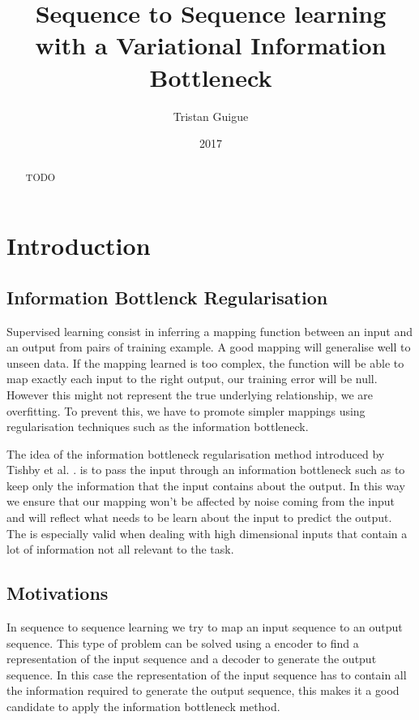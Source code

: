 \documentclass[11pt,oneside,openright]{report}
\title{Sequence to Sequence learning with a Variational Information Bottleneck}
\author{Tristan Guigue}
\date{2017}
\begin{document}
\maketitle

\declaration

\begin{abstract}
TODO
\end{abstract}

\tableofcontents

\chapter{Introduction}

\section{Information Bottlenck Regularisation}
Supervised learning consist in inferring a mapping function between an input and an output from pairs of training example. A good mapping will generalise well to unseen data. If the mapping learned is too complex, the function will be able to map exactly each input to the right output, our training error will be null. However this might not represent the true underlying relationship, we are overfitting. To prevent this, we have to promote simpler mappings using regularisation techniques such as the information bottleneck. 

The idea of the information bottleneck regularisation method introduced by Tishby et al. \cite{tishby}. is to pass the input through an information bottleneck such as to keep only the information that the input contains about the output. In this way we ensure that our mapping won't be affected by noise coming from the input and will reflect what needs to be learn about the input to predict the output. The is especially valid when dealing with high dimensional inputs that contain a lot of information not all relevant to the task.

\section{Motivations}
In sequence to sequence learning we try to map an input sequence to an output sequence. This type of problem can be solved using a encoder to find a representation of the input sequence and a decoder to generate the output sequence. In this case the representation of the input sequence has to contain all the information required to generate the output sequence, this makes it a good candidate to apply the information bottleneck method.
\end{document}
